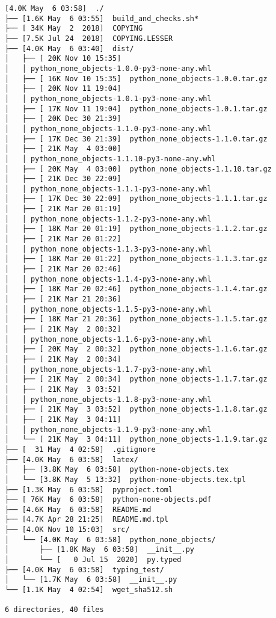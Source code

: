 \documentclass{article}
\begin{document}
\begin{verbatim}
[4.0K May  6 03:58]  ./
├── [1.6K May  6 03:55]  build_and_checks.sh*
├── [ 34K May  2  2018]  COPYING
├── [7.5K Jul 24  2018]  COPYING.LESSER
├── [4.0K May  6 03:40]  dist/
│   ├── [ 20K Nov 10 15:35]
│   │ python_none_objects-1.0.0-py3-none-any.whl
│   ├── [ 16K Nov 10 15:35]  python_none_objects-1.0.0.tar.gz
│   ├── [ 20K Nov 11 19:04]
│   │ python_none_objects-1.0.1-py3-none-any.whl
│   ├── [ 17K Nov 11 19:04]  python_none_objects-1.0.1.tar.gz
│   ├── [ 20K Dec 30 21:39]
│   │ python_none_objects-1.1.0-py3-none-any.whl
│   ├── [ 17K Dec 30 21:39]  python_none_objects-1.1.0.tar.gz
│   ├── [ 21K May  4 03:00]
│   │ python_none_objects-1.1.10-py3-none-any.whl
│   ├── [ 20K May  4 03:00]  python_none_objects-1.1.10.tar.gz
│   ├── [ 21K Dec 30 22:09]
│   │ python_none_objects-1.1.1-py3-none-any.whl
│   ├── [ 17K Dec 30 22:09]  python_none_objects-1.1.1.tar.gz
│   ├── [ 21K Mar 20 01:19]
│   │ python_none_objects-1.1.2-py3-none-any.whl
│   ├── [ 18K Mar 20 01:19]  python_none_objects-1.1.2.tar.gz
│   ├── [ 21K Mar 20 01:22]
│   │ python_none_objects-1.1.3-py3-none-any.whl
│   ├── [ 18K Mar 20 01:22]  python_none_objects-1.1.3.tar.gz
│   ├── [ 21K Mar 20 02:46]
│   │ python_none_objects-1.1.4-py3-none-any.whl
│   ├── [ 18K Mar 20 02:46]  python_none_objects-1.1.4.tar.gz
│   ├── [ 21K Mar 21 20:36]
│   │ python_none_objects-1.1.5-py3-none-any.whl
│   ├── [ 18K Mar 21 20:36]  python_none_objects-1.1.5.tar.gz
│   ├── [ 21K May  2 00:32]
│   │ python_none_objects-1.1.6-py3-none-any.whl
│   ├── [ 20K May  2 00:32]  python_none_objects-1.1.6.tar.gz
│   ├── [ 21K May  2 00:34]
│   │ python_none_objects-1.1.7-py3-none-any.whl
│   ├── [ 21K May  2 00:34]  python_none_objects-1.1.7.tar.gz
│   ├── [ 21K May  3 03:52]
│   │ python_none_objects-1.1.8-py3-none-any.whl
│   ├── [ 21K May  3 03:52]  python_none_objects-1.1.8.tar.gz
│   ├── [ 21K May  3 04:11]
│   │ python_none_objects-1.1.9-py3-none-any.whl
│   └── [ 21K May  3 04:11]  python_none_objects-1.1.9.tar.gz
├── [  31 May  4 02:58]  .gitignore
├── [4.0K May  6 03:58]  latex/
│   ├── [3.8K May  6 03:58]  python-none-objects.tex
│   └── [3.8K May  5 13:32]  python-none-objects.tex.tpl
├── [1.3K May  6 03:58]  pyproject.toml
├── [ 76K May  6 03:58]  python-none-objects.pdf
├── [4.6K May  6 03:58]  README.md
├── [4.7K Apr 28 21:25]  README.md.tpl
├── [4.0K Nov 10 15:03]  src/
│   └── [4.0K May  6 03:58]  python_none_objects/
│       ├── [1.8K May  6 03:58]  __init__.py
│       └── [   0 Jul 15  2020]  py.typed
├── [4.0K May  6 03:58]  typing_test/
│   └── [1.7K May  6 03:58]  __init__.py
└── [1.1K May  4 02:54]  wget_sha512.sh

6 directories, 40 files
\end{verbatim}
\end{document}
